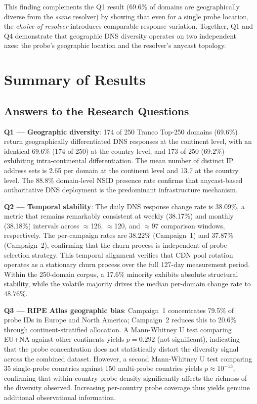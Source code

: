 This finding complements the Q1 result (69.6\% of domains are geographically diverse from the \emph{same} resolver) by showing that even for a single probe location, the \emph{choice of resolver} introduces comparable response variation. Together, Q1 and Q4 demonstrate that geographic \ac{DNS} diversity operates on two independent axes: the probe's geographic location and the resolver's anycast topology.

\bigskip
\section{Summary of Results}
\label{sec:4.6}

\subsection{Answers to the Research Questions}
\label{subsec:4.6.1}

\textbf{Q1 --- Geographic diversity}: 174 of 250 Tranco Top-250 domains (69.6\%) return geographically differentiated \ac{DNS} responses at the continent level, with an identical 69.6\% (174 of 250) at the country level, and 173 of 250 (69.2\%) exhibiting intra-continental differentiation. The mean number of distinct \ac{IP} address sets is 2.65 per domain at the continent level and 13.7 at the country level. The 88.8\% domain-level \ac{NSID} presence rate confirms that anycast-based authoritative \ac{DNS} deployment is the predominant infrastructure mechanism.

\textbf{Q2 --- Temporal stability}: The daily \ac{DNS} response change rate is 38.09\%, a metric that remains remarkably consistent at weekly (38.17\%) and monthly (38.18\%) intervals across $\approx$126, $\approx$120, and $\approx$97 comparison windows, respectively. The per-campaign rates are 38.22\% (Campaign~1) and 37.87\% (Campaign~2), confirming that the churn process is independent of probe selection strategy. This temporal alignment verifies that \ac{CDN} pool rotation operates as a stationary churn process over the full 127-day measurement period. Within the 250-domain corpus, a 17.6\% minority exhibits absolute structural stability, while the volatile majority drives the median per-domain change rate to 48.76\%.

\textbf{Q3 --- RIPE Atlas geographic bias}: Campaign~1 concentrates 79.5\% of probe IDs in Europe and North America; Campaign~2 reduces this to 20.6\% through continent-stratified allocation. A Mann-Whitney U test comparing EU+NA against other continents yields $p = 0.292$ (not significant), indicating that the probe concentration does not statistically distort the diversity signal across the combined dataset. However, a second Mann-Whitney U test comparing 35 single-probe countries against 150 multi-probe countries yields $p \approx 10^{-13}$, confirming that within-country probe density significantly affects the richness of the diversity observed. Increasing per-country probe coverage thus yields genuine additional observational information.

